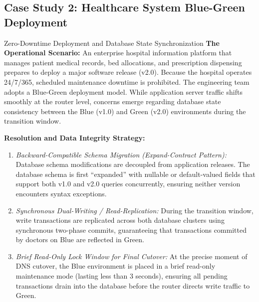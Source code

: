 \documentclass[11pt,a4paper]{article}
\begin{document}
\subsection{Case Study 2: Healthcare System Blue-Green Deployment}
\begin{casestudybox}{Zero-Downtime Deployment and Database State Synchronization}
\textbf{The Operational Scenario:} An enterprise hospital information platform that manages patient medical records, bed allocations, and prescription dispensing prepares to deploy a major software release (v2.0). Because the hospital operates 24/7/365, scheduled maintenance downtime is prohibited. The engineering team adopts a Blue-Green deployment model. While application server traffic shifts smoothly at the router level, concerns emerge regarding database state consistency between the Blue (v1.0) and Green (v2.0) environments during the transition window.

\textbf{Resolution and Data Integrity Strategy:}
\begin{enumerate}
    \item \textit{Backward-Compatible Schema Migration (Expand-Contract Pattern):} Database schema modifications are decoupled from application releases. The database schema is first ``expanded'' with nullable or default-valued fields that support both v1.0 and v2.0 queries concurrently, ensuring neither version encounters syntax exceptions.
    \item \textit{Synchronous Dual-Writing / Read-Replication:} During the transition window, write transactions are replicated across both database clusters using synchronous two-phase commits, guaranteeing that transactions committed by doctors on Blue are reflected in Green.
    \item \textit{Brief Read-Only Lock Window for Final Cutover:} At the precise moment of DNS cutover, the Blue environment is placed in a brief read-only maintenance mode (lasting less than 3 seconds), ensuring all pending transactions drain into the database before the router directs write traffic to Green.
\end{enumerate}
\end{casestudybox}
\end{document}
